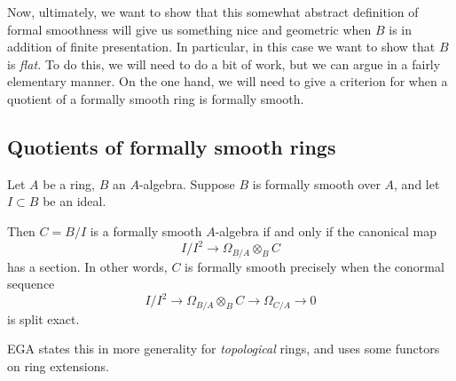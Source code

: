 Now, ultimately, we want to show that this somewhat abstract definition of
formal smoothness will give us something nice and geometric when $B$ is in
addition of finite presentation. In particular, in this case we want to show
that $B$ is \emph{flat.} 
To do this, we will need to do a bit of work, but we can argue in a fairly
elementary manner. On the one hand, we will need to give a criterion for when a
quotient of a formally smooth ring is formally smooth.

\subsection{Quotients of formally smooth rings}


\begin{theorem}[EGA 0-IV, 22.6.1]
Let $A$ be a ring, $B$ an $A$-algebra. Suppose $B$ is formally smooth over $A$,
and let $I \subset B$ be an ideal. 

Then $C = B/I$ is a formally smooth $A$-algebra if and only if the canonical map
\[ I/I^2 \to \Omega_{B/A} \otimes_B C  \]
has a section.
In other words, $C$ is formally smooth precisely when the conormal sequence
\[  I/I^2 \to \Omega_{B/A} \otimes_B C \to \Omega_{C/A} \to 0 \]
is split exact.
\end{theorem} 

EGA states this in more generality for \emph{topological} rings, and uses
some functors on ring extensions. 

